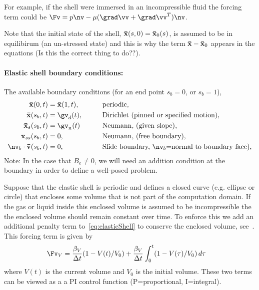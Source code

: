 For example, if the shell were immersed in an incompressible fluid the forcing term could be $\Fv=p\nv - \mu(\grad\vv+\grad\vv^T)\nv$. 

Note that the initial state of the shell, $\mathbf{\bar{x}}(s,0)=\mathbf{\bar{x}}_0(s)$,  is assumed to be in equilibirum (an un-stressed state)
and this is why the term $\mathbf{\bar{x}}-\mathbf{\bar{x}}_0$ appears in the equations (Is this the correct thing to do??). 

\paragraph{Elastic shell boundary conditions:} The available boundary conditions (for an end point $s_b=0$, or $s_b=1$), 
\begin{alignat}{3}
    \xsv(0,t) &= \xsv(1,t) ,  \qquad&& \text{periodic}, \\
    \xsv(s_b,t) &= \gv_d(t) , \qquad&& \text{Dirichlet (pinned or specified motion)}, \\
    \xsv_s(s_b,t) &= \gv_n(t) \qquad&& \text{Neumann, (given slope)}, \\  
    \xsv_{ss}(s_b,t) &= 0,    \qquad&& \text{Neumann, (free boundary)}, \\
    \nv_b\cdot\vsv(s_b,t) &= 0,    \qquad&& \text{Slide boundary, $\nv_b$=normal to boundary face)}, 
\end{alignat}
Note: In the case that $B_e\ne 0$, we will need an addition condition at the boundary in order to
define a well-posed problem.


Suppose that the elastic shell is periodic and defines a closed curve (e.g. ellipse or circle) that encloses some volume that
is not part of the computation domain.
If the gas or liquid inside this enclosed volume is assumed to be incompressible the the enclosed
volume should remain constant over time. To enforce this we add an additional penalty term
to~\eqref{eq:elasticShell} to conserve the enclosed volume, see~\cite{KimHuangShinSung2012}. 
This forcing term is given by
\begin{align}
  \Fv_V &=  \frac{\beta_V}{\dt} (1-V(t)/V_0) + \frac{\beta_V}{\dt} \int_0^t (1-V(\tau)/V_0)\, d\tau
\end{align}
where $V(t)$ is the current volume and $V_0$ is the initial volume. These two terms can be viewed as a 
a PI control function (P=proportional, I=integral). 


